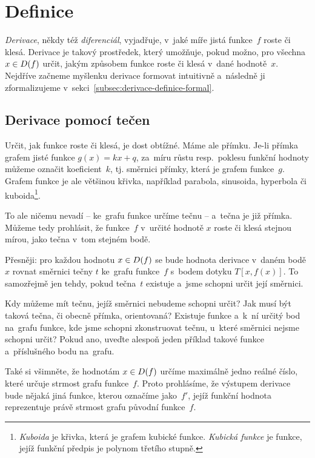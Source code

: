 \section{Definice}
\label{sec:derivace-definice}

\emph{Derivace}, někdy též \emph{diferenciál}, vyjadřuje, v~jaké míře jistá
funkce~$f$ roste či klesá. Derivace je takový prostředek, který umožňuje, pokud
možno, pro všechna ${x \in D(f)}$ určit, jakým způsobem funkce roste či
klesá v~dané hodnotě~$x$. Nejdříve začneme myšlenku derivace formovat intuitivně
a~následně ji zformalizujeme v~sekci~\ref{subsec:derivace-definice-formal}.

\subsection{Derivace pomocí tečen}
\label{subsec:derivace-pomoci-tecen}

Určit, jak funkce roste či klesá, je dost obtížné.
Máme ale přímku.
Je-li přímka grafem jisté funkce ${g(x) = kx + q}$, za~míru růstu resp.~poklesu
funkční hodnoty můžeme označit koeficient~$k$, tj. směrnici přímky, která je grafem
funkce~$g$.
Grafem funkce je ale většinou křivka, například parabola, sinusoida, hyperbola či
kuboida\footnote{\emph{Kuboida} je křivka, která je grafem kubické funkce.
\emph{Kubická funkce} je funkce, jejíž funkční předpis je polynom třetího stupně.}.

To ale ničemu nevadí -- ke~grafu funkce určíme tečnu -- a~tečna je již přímka.
Můžeme tedy prohlásit, že funkce~$f$ v~určité hodnotě $x$ roste či klesá stejnou
mírou, jako tečna v~tom stejném bodě.

Přesněji: pro každou hodnotu ${x \in D(f)}$ se bude hodnota derivace v~daném
bodě~$x$ rovnat směrnici tečny $t$ ke~grafu funkce~$f$ s~bodem dotyku $T[x, f(x)]$.
To samozřejmě jen tehdy, pokud tečna~$t$ existuje a~jsme schopni určit její směrnici.

\begin{exercise}
    Kdy můžeme mít tečnu, jejíž směrnici nebudeme schopni určit? Jak musí být taková
    tečna, či obecně přímka, orientovaná? Existuje funkce a~k~ní určitý bod na~grafu
    funkce, kde jsme schopni zkonstruovat tečnu, u~které směrnici nejsme schopni
    určit? Pokud ano, uveďte alespoň jeden příklad takové funkce a~příslušného bodu
    na~grafu.
\end{exercise}

Také si všimněte, že hodnotám ${x \in D(f)}$ určíme maximálně jedno reálné
číslo, které určuje strmost grafu funkce~$f$.
Proto prohlásíme, že výstupem derivace bude nějaká jiná funkce, kterou označíme
jako~$f'$, jejíž funkční hodnota reprezentuje právě strmost grafu původní funkce~$f$.

